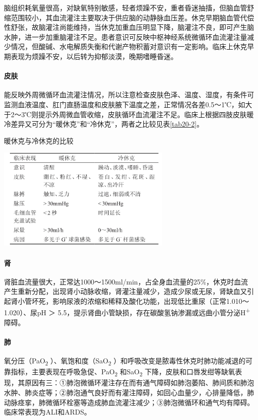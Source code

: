 脑组织耗氧量很高，对缺氧特别敏感，轻者烦躁不安，重者昏迷抽搐，但脑血管舒缩范围较小，其血流灌注主要取决于供应脑的动静脉血压差。休克早期脑血管代偿性舒张，故脑灌注尚能维持，当休克加重血压明显下降，脑灌注不良，即可产生脑水肿，进一步加重脑灌注不足。患者意识可反映中枢神经系统微循环血流灌注量减少情况，但酸碱、水电解质失衡和代谢产物积蓄对意识有一定影响。临床上休克早期表现为烦躁不安，以后转为抑郁淡漠，晚期嗜睡昏迷。

\paragraph{皮肤}

能反映外周微循环血流灌注情况，所以注意检查皮肤色泽、温度、湿度，有条件可监测血液温度、肛门直肠温度和皮肤腋下温度之差，正常情况各差0.5～1℃，如大于2～3℃则提示外周微血管收缩，皮肤循环血流灌注不足。临床上根据四肢皮肤暖冷差异又可分为“暖休克”和“冷休克”，两者之比较见表\ref{tab20-2}。

\begin{table}[htbp]
\centering
\caption{暖休克与冷休克的比较}
\label{tab20-2}
\includegraphics[width=3.32292in,height=1.95833in]{./images/Image00085.jpg}
\end{table}

\paragraph{肾}

肾脏血流量很大，正常达1000～1500ml/min，占全身血流量的25\%，休克时血流产生重新分配，出现肾小动脉收缩，肾灌注量减少，造成少尿或无尿，肾缺血又引起肾小管坏死，影响尿液的浓缩和稀释及酸化功能，出现低比重尿（正常1.010～1.020）、尿pH
＞
5.5，提示肾曲小管缺损，存在碳酸氢钠渗漏或远曲小管分泌H\textsuperscript{+}
障碍。

\paragraph{肺}

氧分压（PaO\textsubscript{2} ）、氧饱和度（SaO\textsubscript{2}
）和呼吸改变是脓毒性休克时肺功能减退的可靠指标，主要表现在呼吸急促、PaO\textsubscript{2}
和SaO\textsubscript{2}
下降，皮肤和口唇发绀等缺氧表现，其原因有三：①肺泡微循环灌注存在而有通气障碍如肺泡萎陷、肺间质和肺泡水肿、肺炎症等；②肺泡通气良好而有灌注障碍，如回心血量少，心排量降低，肺动脉痉挛，肺微循环栓塞等造成肺血流灌注减少；③肺泡微循环和通气均有障碍。临床常表现为ALI和ARDS。

